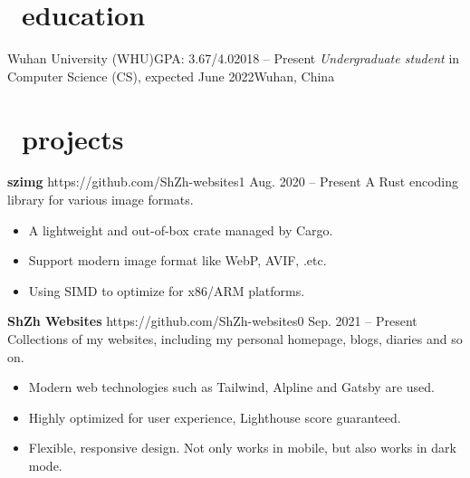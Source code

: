 \documentclass{common}
\begin{document}

\section{\faGraduationCap\ education}
\educationsubsection
    {Wuhan University (WHU)}{GPA: 3.67/4.0}{2018 -- Present}
    {\textit{Undergraduate student} in Computer Science (CS), expected June 2022}{Wuhan, China}

\section{\faCubes\ projects}
\projectsubsection
    {\textbf{szimg}}
    {https://github.com/ShZh-websites}{1}
    {Aug. 2020 -- Present}
A Rust encoding library for various image formats.
\begin{itemize}
    \item A lightweight and out-of-box crate managed by Cargo.
    \item Support modern image format like WebP, AVIF, .etc.
    \item Using SIMD to optimize for x86/ARM platforms.
\end{itemize}
\projectsubsection
    {\textbf{ShZh Websites}}
    {https://github.com/ShZh-websites}{0}
    {Sep. 2021 -- Present}
Collections of my websites, including my personal homepage, blogs, diaries and so on.
\begin{itemize}
    \item Modern web technologies such as Tailwind, Alpline and Gatsby are used.
    \item Highly optimized for user experience, Lighthouse score guaranteed.
    \item Flexible, responsive design. Not only works in mobile, but also works in dark mode.
\end{itemize}
\end{document}
